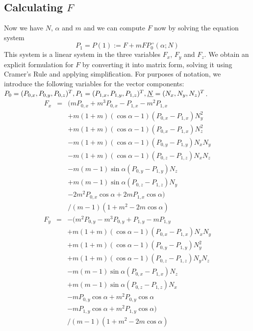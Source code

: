 \documentclass[journal, letterpaper]{IEEEtran}
\begin{document}
\subsection{Calculating $F$}
Now we have $N$, $\alpha$ and $m$ and we can compute $F$ now by solving the equation system
\begin{equation}
 P_1 = P(1) := F + m FP_0 ^{\;\circ} (\alpha; N)
\label{eq:Feq}
\end{equation}
This system is a linear system in the three variables $F_x$, $F_y$ and $F_z$. We obtain an explicit formulation for $F$ by converting it into matrix form, solving it using Cramer's Rule and applying simplification. For purposes of notation, we introduce the following variables for the vector components: $P_0=(P_{0,x},P_{0,y},P_{0,z})^T, P_1=(P_{1,x},P_{1,y},P_{1,z})^T,\\ \underline{N}=(N_x,N_y,N_z)^T$.
\begin{equation}
\begin{array}{lcl}
	F_x &=& (m P_{0,x} + m^3 P_{0,x} - P_{1,x} - m^2 P_{1,x} \\
		&& + m (1+m) (\cos\alpha - 1) (P_{0,x} - P_{1,x}) N_y^2 \\
		&& + m (1+m) (\cos\alpha - 1) (P_{0,x} - P_{1,x}) N_z^2 \\
		&& - m (1+m) (\cos\alpha - 1) (P_{0,y} - P_{1,y}) N_x N_y \\
		&& - m (1+m) (\cos\alpha - 1) (P_{0,z} - P_{1,z}) N_x N_z \\
		&& - m (m-1) \sin\alpha (P_{0,y} - P_{1,y}) N_z \\
		&& + m (m-1) \sin\alpha (P_{0,z} - P_{1,z}) N_y \\
		&& - 2 m^2 P_{0,x} \cos\alpha + 2 m P_{1,x} \cos\alpha ) \\
		&& / (m-1)(1 + m^2 - 2m\cos\alpha)
\end{array}
\label{eq:Fx}
\end{equation}
\begin{equation}
\begin{array}{lcl}
 F_y &=& -(m^2 P_{0,y} - m^3 P_{0,y} + P_{1,y} - m P_{1,y} \\
		&& + m (1+m) (\cos\alpha - 1) (P_{0,x} - P_{1,x}) N_x N_y \\
		&& + m (1+m) (\cos\alpha - 1) (P_{0,y} - P_{1,y}) N_y^2 \\
		&& + m (1+m) (\cos\alpha - 1) (P_{0,z} - P_{1,z}) N_y N_z \\
		&& - m (m-1) \sin\alpha (P_{0,x} - P_{1,x}) N_z \\
		&& + m (m-1) \sin\alpha (P_{0,z} - P_{1,z}) N_x \\
		&& - m P_{0,y} \cos\alpha + m^2 P_{0,y} \cos\alpha \\
		&& - m P_{1,y} \cos\alpha + m^2 P_{1,y} \cos\alpha) \\
		&& / (m-1)(1 + m^2 - 2m\cos\alpha)
\end{array}
\label{eq:Fy}
\end{equation}
\end{document}
